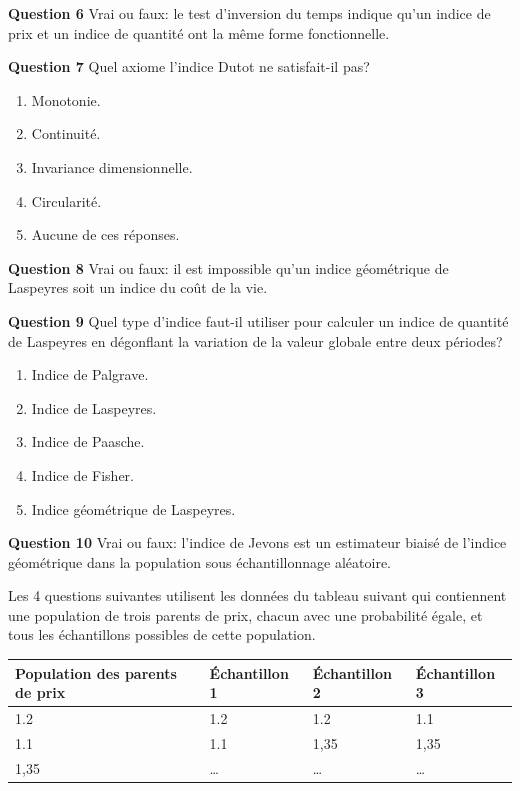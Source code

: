 \documentclass[
]{article}
\begin{document}
\textbf{Question 6} Vrai ou faux: le test d'inversion du temps indique qu'un indice de prix et un indice de quantité ont la même forme fonctionnelle.

\textbf{Question 7} Quel axiome l'indice Dutot ne satisfait-il pas?

\begin{enumerate}
\def\labelenumi{\alph{enumi})}
\item
  Monotonie.
\item
  Continuité.
\item
  Invariance dimensionnelle.
\item
  Circularité.
\item
  Aucune de ces réponses.
\end{enumerate}

\textbf{Question 8} Vrai ou faux: il est impossible qu'un indice géométrique de Laspeyres soit un indice du coût de la vie.

\textbf{Question 9} Quel type d'indice faut-il utiliser pour calculer un indice de quantité de Laspeyres en dégonflant la variation de la valeur globale entre deux périodes?

\begin{enumerate}
\def\labelenumi{\alph{enumi})}
\item
  Indice de Palgrave.
\item
  Indice de Laspeyres.
\item
  Indice de Paasche.
\item
  Indice de Fisher.
\item
  Indice géométrique de Laspeyres.
\end{enumerate}

\textbf{Question 10} Vrai ou faux: l'indice de Jevons est un estimateur biaisé de l'indice géométrique dans la population sous échantillonnage aléatoire.

Les 4 questions suivantes utilisent les données du tableau suivant qui contiennent une population de trois parents de prix, chacun avec une probabilité égale, et tous les échantillons possibles de cette population.

\begin{longtable}[]{@{}llll@{}}
\toprule
Population des parents de prix & Échantillon 1 & Échantillon 2 & Échantillon 3 \\
\midrule
\endhead
1.2 & 1.2 & 1.2 & 1.1 \\
1.1 & 1.1 & 1,35 & 1,35 \\
1,35 & \ldots{} & \ldots{} & \ldots{} \\
\bottomrule
\end{longtable}
\end{document}
